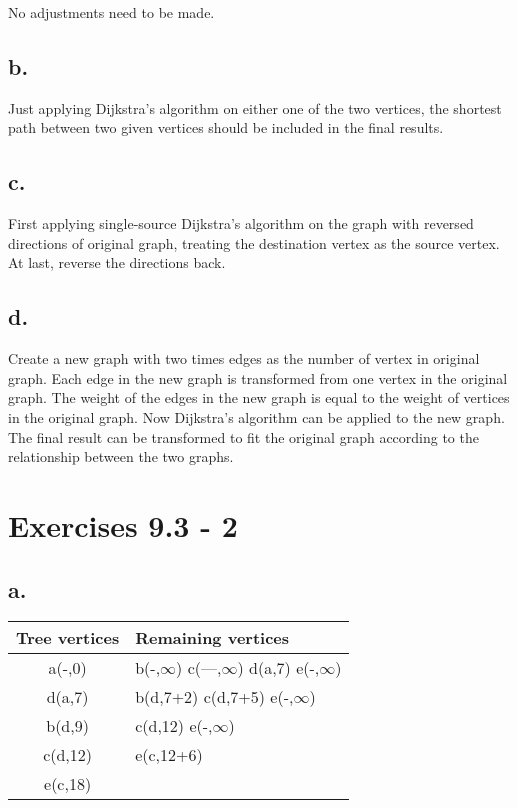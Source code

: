 \documentclass{article}
\begin{document}
No adjustments need to be made.

\subsection*{b.}

Just applying Dijkstra's algorithm on either one of the two vertices, the shortest path between two given vertices should be included in the final results.

\subsection*{c.}

First applying single-source Dijkstra's algorithm on the graph with reversed directions of original graph, treating the destination vertex as the source vertex. At last, reverse the directions back.

\subsection*{d.}

Create a new graph with two times edges as the number of vertex in original graph. Each edge in the new graph is transformed from one vertex in the original graph. The weight of the edges in the new graph is equal to the weight of vertices in the original graph. Now Dijkstra's algorithm can be applied to the new graph. The final result can be transformed to fit the original graph according to the relationship between the two graphs.

\section{Exercises 9.3 - 2}

\subsection*{a.}

\begin{center}
  \begin{tabular}{c l}
    \hline
    Tree vertices & Remaining vertices \\
    \hline
    a(-,0)& b(-,$\infty$) c(—,$\infty$) d(a,7) e(-,$\infty$)\\
    d(a,7)& b(d,7+2) c(d,7+5) e(-,$\infty$)\\
    b(d,9)& c(d,12) e(-,$\infty$)\\
    c(d,12)& e(c,12+6)\\
    e(c,18)&\\
    \hline
  \end{tabular}
\end{center}
\end{document}
